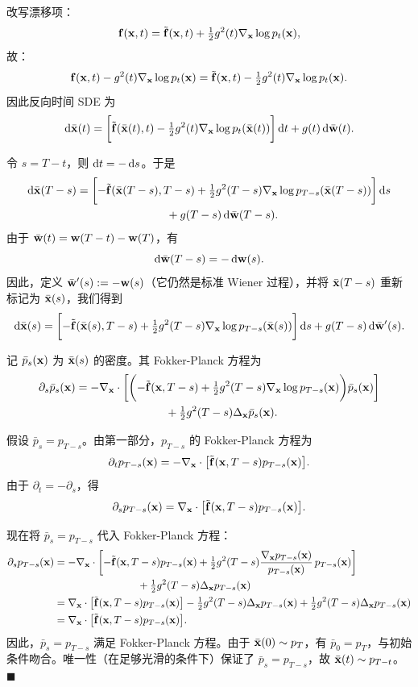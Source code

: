 改写漂移项：
\[
{\mathbf{f}}({\mathbf{x}}, t) = \tilde {{\mathbf{f}}}({\mathbf{x}}, t) + \tfrac{1}{2} g^2(t) \nabla_{{\mathbf{x}}} \log p_t({\mathbf{x}}),
\]
故：
\[
{\mathbf{f}}({\mathbf{x}}, t) - g^2(t) \nabla_{{\mathbf{x}}} \log p_t({\mathbf{x}})
= \tilde {{\mathbf{f}}}({\mathbf{x}}, t) - \tfrac{1}{2} g^2(t) \nabla_{{\mathbf{x}}} \log p_t({\mathbf{x}}).
\]
因此反向时间 SDE 为
\[
\mathop{}\!\mathrm{d} \bar{{\mathbf{x}}}(t)
=
\biggl[
\tilde {{\mathbf{f}}}(\bar{{\mathbf{x}}}(t), t)
- \tfrac{1}{2} g^2(t)\nabla_{{\mathbf{x}}}\log p_t(\bar{{\mathbf{x}}}(t))
\biggr]\mathop{}\!\mathrm{d} t
+ g(t)\mathop{}\!\mathrm{d} \bar{{\mathbf{w}}}(t).
\]

令 $s = T - t$，则 $\mathop{}\!\mathrm{d} t = -\mathop{}\!\mathrm{d} s$。于是
\begin{align*}
\mathop{}\!\mathrm{d} \bar{{\mathbf{x}}}(T - s)
&=
\biggl[
-\tilde {{\mathbf{f}}}(\bar{{\mathbf{x}}}(T - s), T - s)
+ \tfrac{1}{2} g^2(T - s)\nabla_{{\mathbf{x}}}\log p_{T-s}(\bar{{\mathbf{x}}}(T - s))
\biggr]\mathop{}\!\mathrm{d} s \\
&\qquad\qquad\qquad\qquad
+ g(T - s)\mathop{}\!\mathrm{d} \bar{{\mathbf{w}}}(T - s).
\end{align*}
由于 $\bar{{\mathbf{w}}}(t) = {\mathbf{w}}(T - t) - {\mathbf{w}}(T)$，有
\[
\mathop{}\!\mathrm{d} \bar{{\mathbf{w}}}(T - s) = -\mathop{}\!\mathrm{d} {\mathbf{w}}(s).
\]
因此，定义 $\bar{{\mathbf{w}}}'(s) := -{\mathbf{w}}(s)$（它仍然是标准 Wiener 过程），并将 $\bar{{\mathbf{x}}}(T-s)$ 重新标记为 $\bar{{\mathbf{x}}}(s)$，我们得到
\[
\mathop{}\!\mathrm{d} \bar{{\mathbf{x}}}(s)
=
\biggl[
-\tilde {{\mathbf{f}}}(\bar{{\mathbf{x}}}(s), T - s)
+ \tfrac{1}{2} g^2(T - s)\nabla_{{\mathbf{x}}}\log p_{T-s}(\bar{{\mathbf{x}}}(s))
\biggr]\mathop{}\!\mathrm{d} s
+ g(T - s)\mathop{}\!\mathrm{d} \bar{{\mathbf{w}}}'(s).
\]

记 $\bar p_s({\mathbf{x}})$ 为 $\bar{{\mathbf{x}}}(s)$ 的密度。其 Fokker-Planck 方程为
\begin{align*}
\partial_s \bar p_s({\mathbf{x}})
&=
-\nabla_{{\mathbf{x}}}\cdot
\biggl[
\biggl(
-\tilde {{\mathbf{f}}}({\mathbf{x}}, T - s)
+ \tfrac{1}{2} g^2(T - s)\nabla_{{\mathbf{x}}}\log p_{T-s}({\mathbf{x}})
\biggr)\bar p_s({\mathbf{x}})
\biggr] \\
&\qquad\qquad\qquad\qquad
+ \tfrac{1}{2} g^2(T - s)\Delta_{{\mathbf{x}}}\bar p_s({\mathbf{x}}).
\end{align*}

假设 $\bar p_s = p_{T-s}$。由第一部分，$p_{T-s}$ 的 Fokker-Planck 方程为
\[
\partial_t p_{T-s}({\mathbf{x}})
=
-\nabla_{{\mathbf{x}}}\cdot\bigl[\tilde {{\mathbf{f}}}({\mathbf{x}}, T - s)p_{T-s}({\mathbf{x}})\bigr].
\]
由于 $\partial_t = -\partial_s$，得
\[
\partial_s p_{T-s}({\mathbf{x}})
=
\nabla_{{\mathbf{x}}}\cdot\bigl[\tilde {{\mathbf{f}}}({\mathbf{x}}, T - s)p_{T-s}({\mathbf{x}})\bigr].
\]

现在将 $\bar p_s = p_{T-s}$ 代入 Fokker-Planck 方程：
\begin{align*}
\partial_s p_{T-s}({\mathbf{x}})
&=
-\nabla_{{\mathbf{x}}}\cdot
\biggl[
-\tilde {{\mathbf{f}}}({\mathbf{x}}, T - s)p_{T-s}({\mathbf{x}})
+ \tfrac{1}{2} g^2(T - s)\frac{\nabla_{{\mathbf{x}}}p_{T-s}({\mathbf{x}})}{p_{T-s}({\mathbf{x}})}\,p_{T-s}({\mathbf{x}})
\biggr] \\
&\qquad\qquad\qquad\qquad
+ \tfrac{1}{2} g^2(T - s)\Delta_{{\mathbf{x}}}p_{T-s}({\mathbf{x}}) \\
&=
\nabla_{{\mathbf{x}}}\cdot\bigl[\tilde {{\mathbf{f}}}({\mathbf{x}}, T - s)p_{T-s}({\mathbf{x}})\bigr]
-\tfrac{1}{2} g^2(T - s)\Delta_{{\mathbf{x}}}p_{T-s}({\mathbf{x}})
+\tfrac{1}{2} g^2(T - s)\Delta_{{\mathbf{x}}}p_{T-s}({\mathbf{x}}) \\
&=
\nabla_{{\mathbf{x}}}\cdot\bigl[\tilde {{\mathbf{f}}}({\mathbf{x}}, T - s)p_{T-s}({\mathbf{x}})\bigr].
\end{align*}
因此，$\bar p_s = p_{T-s}$ 满足 Fokker-Planck 方程。由于 $\bar{{\mathbf{x}}}(0) \sim p_T$，有 $\bar p_0 = p_T$，与初始条件吻合。唯一性（在足够光滑的条件下）保证了 $\bar p_s = p_{T-s}$，故 $\bar{{\mathbf{x}}}(t) \sim p_{T-t}$。
\hfill$\blacksquare$



